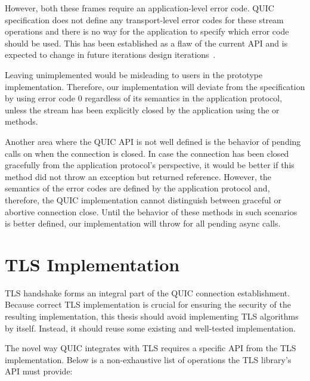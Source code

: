 However, both these frames require an application-level error code. QUIC specification does not
define any transport-level error codes for these stream operations and there is no way for the
application to specify which error code should be used. This has been established as a flaw of the
current API and is expected to change in future iterations design
iterations~\cite{dotnetGithubQuicShutdown}.

Leaving  unimplemented would be misleading to users in the prototype
implementation. Therefore, our implementation will deviate from the specification by using error
code 0 regardless of its semantics in the application protocol, unless the stream has been
explicitly closed by the application using the  or  methods.

Another area where the QUIC API is not well defined is the behavior of pending 
calls on \QuicConnection{} when the connection is closed. In case the connection has been closed
gracefully from the application protocol's perspective, it would be better if this method did not
throw an exception but returned  reference. However, the semantics of the error codes
are defined by the application protocol and, therefore, the QUIC implementation cannot distinguish
between graceful or abortive connection close. Until the behavior of these methods in such scenarios
is better defined, our implementation will throw 
for all pending async calls.

\section{TLS Implementation}

TLS handshake forms an integral part of the QUIC connection establishment. Because correct TLS
implementation is crucial for ensuring the security of the resulting implementation, this thesis
should avoid implementing TLS algorithms by itself. Instead, it should reuse some existing and
well-tested implementation.

The novel way QUIC integrates with TLS requires a specific API from the TLS implementation. Below is
a non-exhaustive list of operations the TLS library's API must provide:

